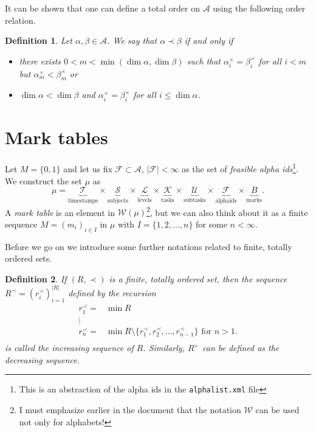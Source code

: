 \documentclass{scrartcl}
\newtheorem{mydef}{Definition}
\begin{document}
It can be shown that one can define a total order on $\mathcal{A}$ using the following order relation.

\begin{mydef}
Let $\alpha, \beta\in\mathcal{A}$. We say that $\alpha\prec\beta$ if and only if
\begin{itemize}
\item there exists $0<m<\min(\dim\alpha,\dim\beta)$ such that $\alpha^{\times}_i=\beta^{\times}_i$ for all $i<m$ but $\alpha^{\times}_m<\beta^{\times}_m$ or
\item $\dim\alpha < \dim\beta$ and $\alpha^{\times}_i=\beta^{\times}_i$ for all $i\leq\dim\alpha$.
\end{itemize}
\end{mydef}

\section{Mark tables}
Let $M=\{0,1\}$ and let us fix $\mathcal{F}\subset\mathcal{A}$, $|\mathcal{F}|<\infty$ as the set of \emph{feasible alpha ids}\footnote{This is an abstraction of the alpha ids in the \texttt{alphalist.xml} file}. We construct the set $\mu$ as 
$$\mu=\underbrace{\mathcal{T}}_{\mbox{timestamps}}\times\underbrace{\mathcal{S}}_{\mbox{subjects}}\times\underbrace{\mathcal{L}}_{\mbox{levels}}\times\underbrace{\mathcal{K}}_{\mbox{tasks}}\times\underbrace{\mathcal{U}}_{\mbox{subtasks}}\times\underbrace{\mathcal{F}}_{\mbox{alphaids}}\times \underbrace{B}_{\mbox{marks}}.$$ 
A \emph{mark table} is an element in $\mathcal{W}(\mathcal{\mu})$\footnote{I must emphasize earlier in the document that the notation $\mathcal{W}$ can be used not only for alphabets!}, but we can also think about it as a finite sequence $M=(m_i)_{i\in I}$ in $\mu$ with $I=\{1,2,\ldots,n\}$ for some $n<\infty$.

Before we go on we introduce some further notations related to finite, totally ordered sets.
\begin{mydef}
If $(R,\prec)$ is a finite, totally ordered set, then the sequence $R^{\prec}=(r^{\prec}_i)_{i=1}^{|R|}$ defined by the recursion
\begin{equation}
\begin{split}
r^{\prec}_1= & \min R\\
\vdots &\\
r^{\prec}_n = & \min R\setminus\{r^{\prec}_1,r^{\prec}_2,\ldots,r^{\prec}_{n-1}\} \mbox{ for } n>1.\\
\end{split}
\end{equation}
is called the \emph{increasing sequence} of $R$. Similarly, $R^{\succ}$ can be defined as the \emph{decreasing sequence}.
\end{mydef}
\end{document}
